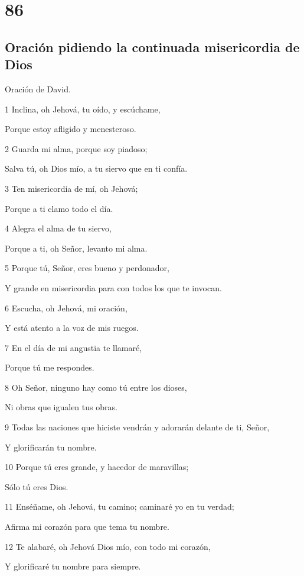 \chapter{86}

\section*{Oración pidiendo la continuada misericordia de Dios}

\par Oración de David.

\par 1 Inclina, oh Jehová, tu oído, y escúchame,
\par Porque estoy afligido y menesteroso.
\par 2 Guarda mi alma, porque soy piadoso;
\par Salva tú, oh Dios mío, a tu siervo que en ti confía.
\par 3 Ten misericordia de mí, oh Jehová;
\par Porque a ti clamo todo el día.
\par 4 Alegra el alma de tu siervo,
\par Porque a ti, oh Señor, levanto mi alma.
\par 5 Porque tú, Señor, eres bueno y perdonador,
\par Y grande en misericordia para con todos los que te invocan.
\par 6 Escucha, oh Jehová, mi oración,
\par Y está atento a la voz de mis ruegos.
\par 7 En el día de mi angustia te llamaré,
\par Porque tú me respondes.
\par 8 Oh Señor, ninguno hay como tú entre los dioses,
\par Ni obras que igualen tus obras.
\par 9 Todas las naciones que hiciste vendrán y adorarán delante de ti, Señor,
\par Y glorificarán tu nombre.
\par 10 Porque tú eres grande, y hacedor de maravillas;
\par Sólo tú eres Dios.
\par 11 Enséñame, oh Jehová, tu camino; caminaré yo en tu verdad;
\par Afirma mi corazón para que tema tu nombre.
\par 12 Te alabaré, oh Jehová Dios mío, con todo mi corazón,
\par Y glorificaré tu nombre para siempre.
